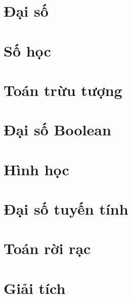 \documentclass[oneside]{book}
\begin{document}
\newpage

\tableofcontents

\newpage

\part{Đại số}




\part{Số học}




\part{Toán trừu tượng}







\part{Đại số Boolean}


\part{Hình học}



\part{Đại số tuyến tính}



\part{Toán rời rạc}


\part{Giải tích}


\end{document}
